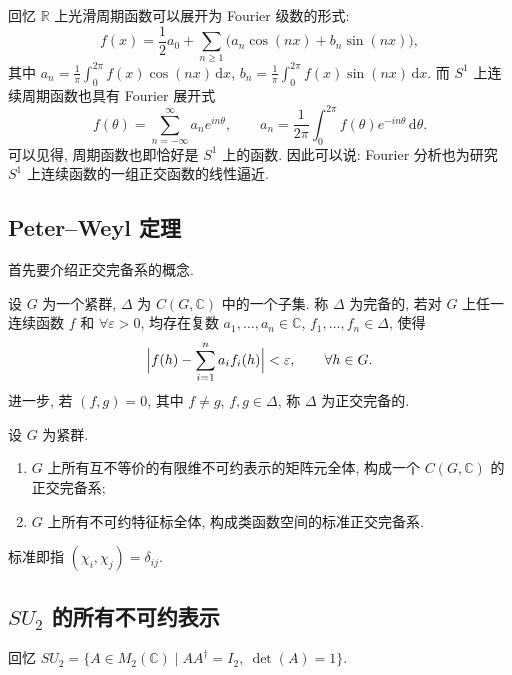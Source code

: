 回忆 $\mathbb{R}$ 上光滑周期函数可以展开为 Fourier 级数的形式:
\[
  f(x)=\frac12a_0+\sum_{n\ge1}\bigl(a_n\cos(nx)+b_n\sin(nx)\bigr),
\]
其中 $a_n=\frac{1}{\pi}\int_0^{2\pi}f(x)\cos(nx)\,\mathrm{d}x$,
$b_n=\frac{1}{\pi}\int_0^{2\pi}f(x)\sin(nx)\,\mathrm{d}x$.
而 $S^1$ 上连续周期函数也具有 Fourier 展开式
\[
  f(\theta)=\sum_{n=-\infty}^{\infty}a_ne^{in\theta},
  \qquad a_n=\frac{1}{2\pi}\int_0^{2\pi}f(\theta)e^{-in\theta}\,\mathrm{d}\theta .
\]
可以见得, 周期函数也即恰好是 $S^1$ 上的函数. 因此可以说: Fourier 分析也为研究
$S^1$ 上连续函数的一组正交函数的线性逼近.

\subsection{Peter--Weyl 定理}

首先要介绍正交完备系的概念.

\begin{definition}[完备系]\label{def:complete-system}
设 $G$ 为一个紧群, $\Delta$ 为 $C(G,\mathbb{C})$ 中的一个子集.
称 $\Delta$ 为完备的, 若对 $G$ 上任一连续函数 $f$ 和 $\forall\varepsilon>0$,
均存在复数 $a_1,\dots,a_n\in\mathbb{C}$, $f_1,\dots,f_n\in\Delta$, 使得
\[
  \Bigl|f(h)-\sum_{i=1}^{n}a_if_i(h)\Bigr|<\varepsilon,\qquad\forall h\in G .
\]
进一步, 若 $(f,g)=0$, 其中 $f\ne g$, $f,g\in\Delta$, 称 $\Delta$ 为正交完备的.
\end{definition}

\begin{theorem}\label{thm:peter-weyl}
设 $G$ 为紧群.
\begin{enumerate}
  \item $G$ 上所有互不等价的有限维不可约表示的矩阵元全体, 构成一个 $C(G,\mathbb{C})$
        的正交完备系;
  \item $G$ 上所有不可约特征标全体, 构成类函数空间的标准正交完备系.
\end{enumerate}
\end{theorem}

\begin{remark}\label{rem:standard-character}
标准即指 $(\chi_i,\chi_j)=\delta_{ij}$.
\end{remark}

\subsection{$SU_2$ 的所有不可约表示}

回忆 $SU_2=\{A\in M_2(\mathbb{C})\mid AA^{\dagger}=I_2,\ \det(A)=1\}$.

